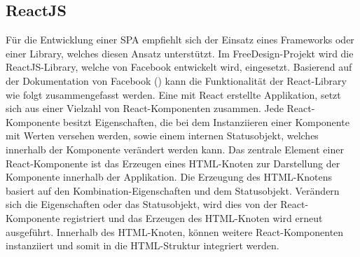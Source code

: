 \subsection{ReactJS}
Für die Entwicklung einer SPA empfiehlt sich der Einsatz eines Frameworks oder einer Library, welches diesen Ansatz unterstützt. Im FreeDesign-Projekt wird die ReactJS-Library, welche von Facebook entwickelt wird, eingesetzt.
Basierend auf der Dokumentation von Facebook (\cite{Facebook:React}) kann die Funktionalität der React-Library wie folgt zusammengefasst werden.
Eine mit React erstellte Applikation, setzt sich aus einer Vielzahl von React-Komponenten zusammen. Jede React-Komponente besitzt Eigenschaften, die bei dem Instanziieren einer Komponente mit Werten versehen werden, sowie einem internen Statusobjekt, welches innerhalb der Komponente verändert werden kann. 
Das zentrale Element einer React-Komponente ist das Erzeugen eines HTML-Knoten zur Darstellung der Komponente innerhalb der Applikation. Die Erzeugung des HTML-Knotens basiert auf den Kombination-Eigenschaften und dem Statusobjekt.
Verändern sich die Eigenschaften oder das Statusobjekt, wird dies von der React-Komponente registriert und das Erzeugen des HTML-Knoten wird erneut ausgeführt. Innerhalb des HTML-Knoten, können weitere React-Komponenten instanziiert und somit in die HTML-Struktur integriert werden.


